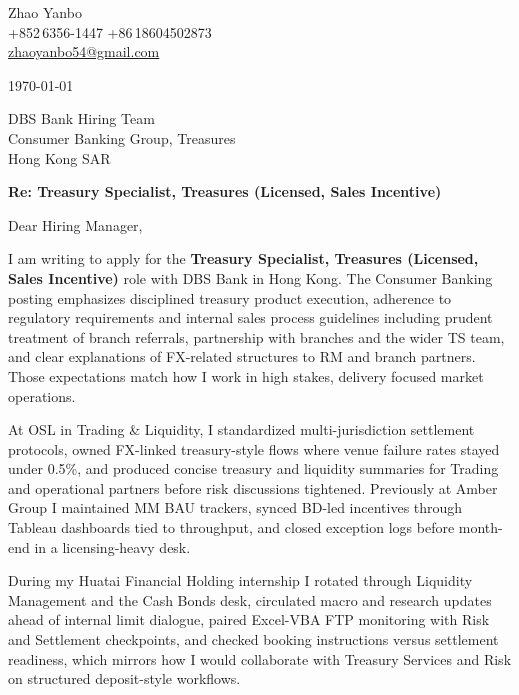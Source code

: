\documentclass[10pt,a4paper]{article}
\begin{document}
\begin{flushleft}
  Zhao Yanbo\\
  +852\,6356-1447 \;\textbar\; +86\,18604502873\\
  \href{mailto:zhaoyanbo54@gmail.com}{zhaoyanbo54@gmail.com}
\end{flushleft}

\vspace{1em}

\begin{flushright}
  \today
\end{flushright}

\vspace{0.75em}

DBS Bank Hiring Team\\
Consumer Banking Group, Treasures\\
Hong Kong SAR

\vspace{1em}

\textbf{Re: Treasury Specialist, Treasures (Licensed, Sales Incentive)}

\vspace{0.75em}

Dear Hiring Manager,

I am writing to apply for the \textbf{Treasury Specialist, Treasures (Licensed, Sales Incentive)} role with DBS Bank in Hong Kong. The Consumer Banking posting emphasizes disciplined treasury product execution, adherence to regulatory requirements and internal sales process guidelines including prudent treatment of branch referrals, partnership with branches and the wider TS team, and clear explanations of FX-related structures to RM and branch partners. Those expectations match how I work in high stakes, delivery focused market operations.

At OSL in Trading \& Liquidity, I standardized multi-jurisdiction settlement protocols, owned FX-linked treasury-style flows where venue failure rates stayed under 0.5\%, and produced concise treasury and liquidity summaries for Trading and operational partners before risk discussions tightened. Previously at Amber Group I maintained MM BAU trackers, synced BD-led incentives through Tableau dashboards tied to throughput, and closed exception logs before month-end in a licensing-heavy desk.

During my Huatai Financial Holding internship I rotated through Liquidity Management and the Cash Bonds desk, circulated macro and research updates ahead of internal limit dialogue, paired Excel-VBA FTP monitoring with Risk and Settlement checkpoints, and checked booking instructions versus settlement readiness, which mirrors how I would collaborate with Treasury Services and Risk on structured deposit-style workflows.
\end{document}
